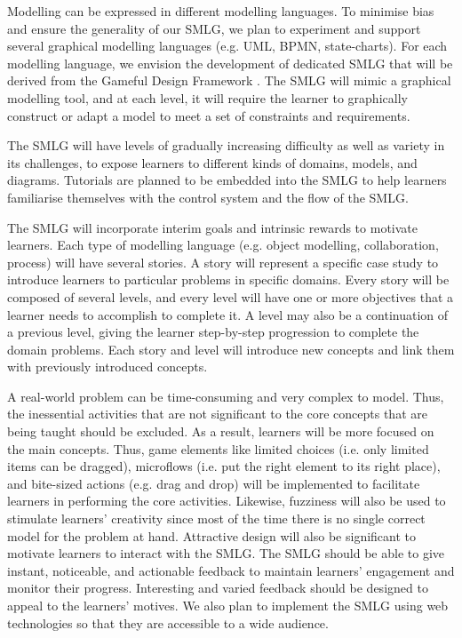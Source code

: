 \documentclass[12pt, a4paper]{report}
\begin{document}
Modelling can be expressed in different modelling languages. To minimise bias and ensure the generality of our SMLG, we plan to experiment and support several graphical modelling languages (e.g. UML, BPMN, state-charts). For each modelling language, we envision the development of dedicated SMLG that will be derived from the Gameful Design Framework \cite{deterding2015lens}. The SMLG will mimic a graphical modelling tool, and at each level, it will require the learner to graphically construct or adapt a model to meet a set of constraints and requirements.

The SMLG will have levels of gradually increasing difficulty as well as variety in its challenges, to expose learners to different kinds of domains, models, and diagrams. Tutorials are planned to be embedded into the SMLG to help learners familiarise themselves with the control system and the flow of the SMLG. 

The SMLG will incorporate interim goals and intrinsic rewards to motivate learners. Each type of modelling language (e.g. object modelling, collaboration, process) will have several stories. A story will represent a specific case study to introduce learners to particular problems in specific domains. Every story will be composed of several levels, and every level will have one or more objectives that a learner needs to accomplish to complete it. A level may also be a continuation of a previous level, giving the learner step-by-step progression to complete the domain problems. Each story and level will introduce new concepts and link them with previously introduced concepts.

A real-world problem can be time-consuming and very complex to model. Thus, the inessential activities that are not significant to the core concepts that are being taught should be excluded. As a result, learners will be more focused on the main concepts. Thus, game elements like limited choices (i.e. only limited items can be dragged), microflows (i.e. put the right element to its right place), and bite-sized actions (e.g. drag and drop) will be implemented to facilitate learners in performing the core activities. Likewise, fuzziness will also be used to stimulate learners' creativity since most of the time there is no single correct model for the problem at hand. Attractive design will also be significant to motivate learners to interact with the SMLG. The SMLG should be able to give instant, noticeable, and actionable feedback to maintain learners' engagement and monitor their progress. Interesting and varied feedback should be designed to appeal to the learners' motives. We also plan to implement the SMLG using web technologies so that they are accessible to a wide audience.
\end{document}
